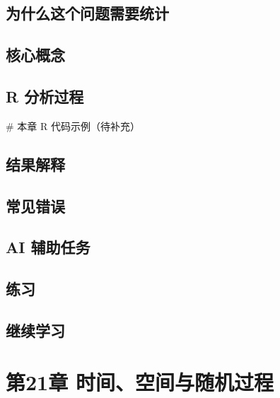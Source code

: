 \documentclass[
  letterpaper,
]{scrbook}
\newenvironment{Shaded}{\begin{snugshade}}{\end{snugshade}}
\newcommand{\CommentTok}[1]{\textcolor[rgb]{0.37,0.37,0.37}{#1}}
\begin{document}
\section{为什么这个问题需要统计}\label{ux4e3aux4ec0ux4e48ux8fd9ux4e2aux95eeux9898ux9700ux8981ux7edfux8ba1-9}

\section{核心概念}\label{ux6838ux5fc3ux6982ux5ff5-9}

\section{R 分析过程}\label{r-ux5206ux6790ux8fc7ux7a0b-11}

\begin{Shaded}
\begin{Highlighting}[]
\CommentTok{\# 本章 R 代码示例（待补充）}
\end{Highlighting}
\end{Shaded}

\section{结果解释}\label{ux7ed3ux679cux89e3ux91ca-9}

\section{常见错误}\label{ux5e38ux89c1ux9519ux8bef-17}

\section{AI 辅助任务}\label{ai-ux8f85ux52a9ux4efbux52a1-10}

\section{练习}\label{ux7ec3ux4e60-19}

\section{继续学习}\label{ux7ee7ux7eedux5b66ux4e60-10}

\chapter{第21章
时间、空间与随机过程}\label{ux7b2c21ux7ae0-ux65f6ux95f4ux7a7aux95f4ux4e0eux968fux673aux8fc7ux7a0b}
\end{document}
